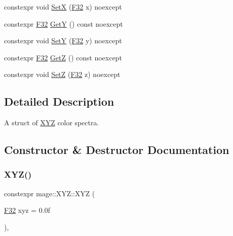 \begin{DoxyCompactItemize}
\item 
constexpr void \mbox{\hyperlink{structmage_1_1_x_y_z_ad0f4356ba8d54cdd4b54482bfbe98374}{SetX}} (\mbox{\hyperlink{namespacemage_aa97e833b45f06d60a0a9c4fc22ae02c0}{F32}} x) noexcept
\item 
constexpr \mbox{\hyperlink{namespacemage_aa97e833b45f06d60a0a9c4fc22ae02c0}{F32}} \mbox{\hyperlink{structmage_1_1_x_y_z_a62c071fb7aa64b393fdb6088207df149}{GetY}} () const noexcept
\item 
constexpr void \mbox{\hyperlink{structmage_1_1_x_y_z_ad7caae74b92c23e12b70bef2d022805c}{SetY}} (\mbox{\hyperlink{namespacemage_aa97e833b45f06d60a0a9c4fc22ae02c0}{F32}} y) noexcept
\item 
constexpr \mbox{\hyperlink{namespacemage_aa97e833b45f06d60a0a9c4fc22ae02c0}{F32}} \mbox{\hyperlink{structmage_1_1_x_y_z_a2bb3aba163d325ebb844d26d240edcc9}{GetZ}} () const noexcept
\item 
constexpr void \mbox{\hyperlink{structmage_1_1_x_y_z_aa2321d3d9fbf155581827794c68781bd}{SetZ}} (\mbox{\hyperlink{namespacemage_aa97e833b45f06d60a0a9c4fc22ae02c0}{F32}} z) noexcept
\end{DoxyCompactItemize}


\subsection{Detailed Description}
A struct of \mbox{\hyperlink{structmage_1_1_x_y_z}{X\+YZ}} color spectra. 

\subsection{Constructor \& Destructor Documentation}
\mbox{\label{structmage_1_1_x_y_z_af8b9ef53daa7463097c6397644a24ebf}} 
\subsubsection{\texorpdfstring{X\+Y\+Z()}{XYZ()}\hspace{0.1cm}{\footnotesize\ttfamily [1/6]}}
{\footnotesize\ttfamily constexpr mage\+::\+X\+Y\+Z\+::\+X\+YZ (\begin{DoxyParamCaption}\item[{\mbox{\hyperlink{namespacemage_aa97e833b45f06d60a0a9c4fc22ae02c0}{F32}}}]{xyz = {\ttfamily 0.0f} }\end{DoxyParamCaption})\hspace{0.3cm}{\ttfamily [explicit]}, {\ttfamily [noexcept]}}

